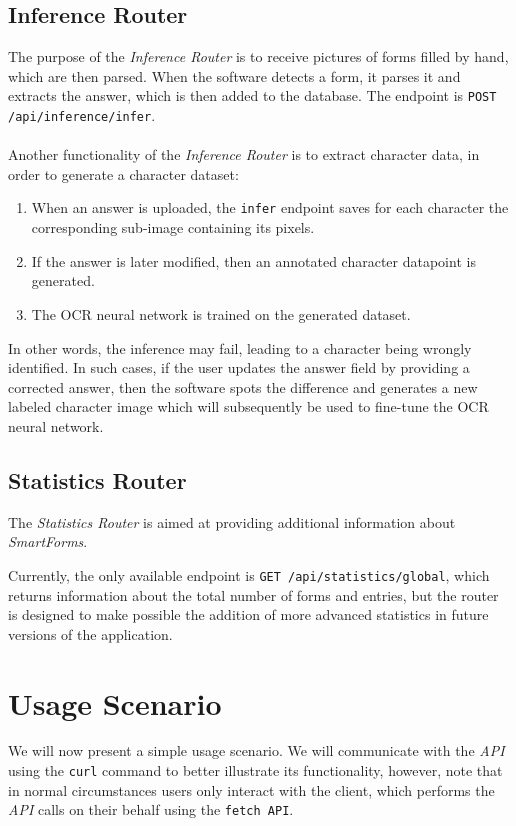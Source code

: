 \documentclass[11pt, a4paper]{report}
\def\code#1{\texttt{#1}}
\begin{document}
\subsection{Inference Router}

The purpose of the \textit{Inference Router} is to receive pictures of forms filled by hand, which are then parsed.
When the software detects a form, it parses it and extracts the answer, which is then added to the database. The endpoint is \code{POST /api/inference/infer}.
\\ \\
Another functionality of the \textit{Inference Router} is to extract character data, in order to generate a character dataset:
\begin{enumerate}
    \item When an answer is uploaded, the \code{infer} endpoint saves for each character the corresponding sub-image containing its pixels.
    \item If the answer is later modified, then an annotated character datapoint is generated.
    \item The OCR neural network is trained on the generated dataset.
\end{enumerate}

In other words, the inference may fail, leading to a character being wrongly identified. In such cases, if the user updates the answer field by providing a corrected answer, then the software spots the difference and  generates a new labeled character image which will subsequently be used to fine-tune the OCR neural network.

\subsection{Statistics Router}

The \textit{Statistics Router} is aimed at providing additional information about \textit{SmartForms}.

Currently, the only available endpoint is \code{GET /api/statistics/global}, which returns information about the total number of forms and entries, but the router is designed to make possible the addition of more advanced statistics in future versions of the application.

\section{Usage Scenario}

We will now present a simple usage scenario. We will communicate with the \textit{API} using the \code{curl} command to better illustrate its functionality, however, note that in normal circumstances users only interact with the client, which performs the \textit{API} calls on their behalf using the \code{fetch API}.
\end{document}
